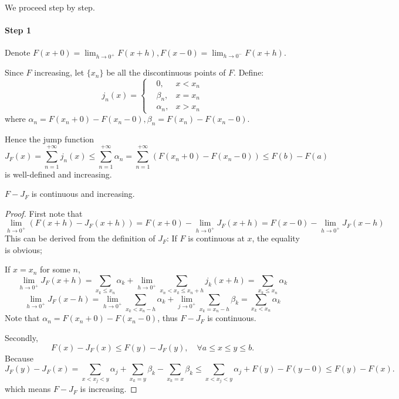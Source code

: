 	\vspace{1em}
	We proceed step by step.

	\paragraph{Step 1}
	Denote $F(x+0)=\lim_{h\to 0^+}F(x+h), F(x-0)=\lim_{h\to 0^-}F(x+h)$.

	Since $F$ increasing, let $\{x_n\}$ be all the discontinuous points of $F$.
	Define:
	\[
	j_n(x) = \left\{\begin{aligned}
		&0, &x<x_n\\ &\beta_n, &x=x_n\\ &\alpha_n, & x>x_n
	\end{aligned}\right.
	\]
	where $\alpha_n = F(x_n+0)-F(x_n-0), \beta_n = F(x_n) - F(x_n-0)$.

	Hence the jump function 
	\[
	J_F(x) = \sum_{n=1}^{+\infty} j_n(x)\le \sum_{n=1}^{+\infty} \alpha_n
	= \sum_{n=1}^{+\infty} (F(x_n+0)-F(x_n-0)) \le F(b)-F(a)
	\]
	is well-defined and increasing.

\begin{lemma}
    $F-J_F$ is continuous and increasing.
\end{lemma}
\begin{proof}[Proof]
    First note that
	\[
	\lim_{h\to 0^+} (F(x+h)-J_F(x+h)) = F(x+0)-\lim_{h\to 0^+} J_F(x+h)
	= F(x-0) - \lim_{h\to 0^+} J_F(x-h)
	\]
	This can be derived from the definition of $J_F$:
	If $F$ is continuous at $x$, the equality is obvious;

	If $x = x_n$ for some $n$,
	\[
	\lim_{h\to 0^+} J_F(x+h) = \sum_{x_k\le x_n} \alpha_k
	+ \lim_{h\to 0^+}\sum_{x_n<x_k\le x_n+h} j_k(x+h)
	= \sum_{x_k\le x_n}\alpha_k
	\]
	\[
	\lim_{h\to 0^+}J_F(x-h) =
	\lim_{h\to 0^+} \sum_{x_k<x_n-h} \alpha_k + \lim_{j\to 0^+}\sum_{x_k=x_n-h} \beta_k
	= \sum_{x_k<x_n} \alpha_k
	\]
	Note that $\alpha_n = F(x_n + 0) - F(x_n - 0)$,
	thus $F-J_F$ is continuous.

	Secondly,
	\[
	F(x)-J_F(x)\le F(y)-J_F(y), \quad\forall a\le x\le y\le b.
	\]
	Because
	\[
	J_F(y)-J_F(x) = \sum_{x<x_j<y}\alpha_j + \sum_{x_k=y}\beta_k - \sum_{x_k=x}\beta_k
	\le \sum_{x<x_j<y}\alpha_j + F(y)-F(y-0) \le F(y) - F(x).
	\]
	which means $F-J_F$ is increasing.
\end{proof}
